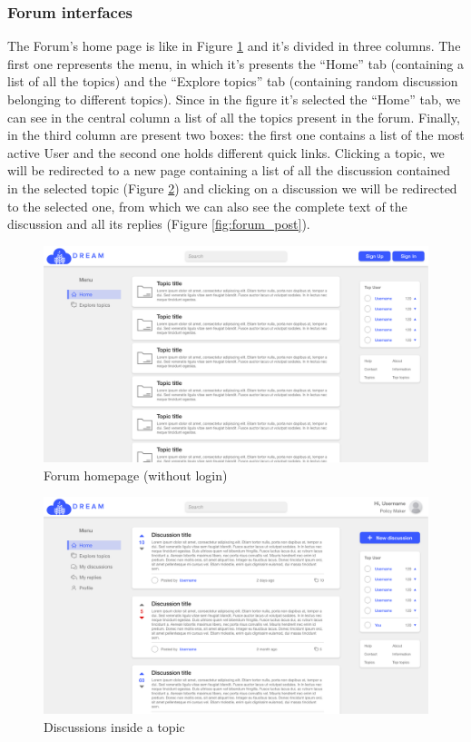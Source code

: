 \subsubsection{Forum interfaces}
The Forum’s home page is like in Figure \ref{fig:forum_home} and it’s divided in three columns. The first one represents the menu, in which it’s presents the “Home” tab (containing a list of all the topics) and the “Explore topics” tab (containing random discussion belonging to different topics).
Since in the figure it’s selected the “Home” tab, we can see in the central column a list of all the topics present in the forum. Finally, in the third column are present two boxes: the first one contains a list of the most active User and the second one holds different quick links.
Clicking a topic, we will be redirected to a new page containing a list of all the discussion contained in the selected topic (Figure \ref{fig:forum_discussion}) and clicking on a discussion we will be redirected to the selected one, from which we can also see the complete text of the discussion and all its replies (Figure \ref{fig:forum_post}).
\begin{figure}[h!]
    \centering
    \includegraphics[scale=0.2]{images/interfaces/forum_topic.png}
    \caption{Forum homepage (without login)}
    \label{fig:forum_home}
\end{figure}
\begin{figure}[h!]
    \centering
    \includegraphics[scale=0.2]{images/interfaces/list_discussion.png}
    \caption{Discussions inside a topic}
    \label{fig:forum_discussion}
\end{figure}
